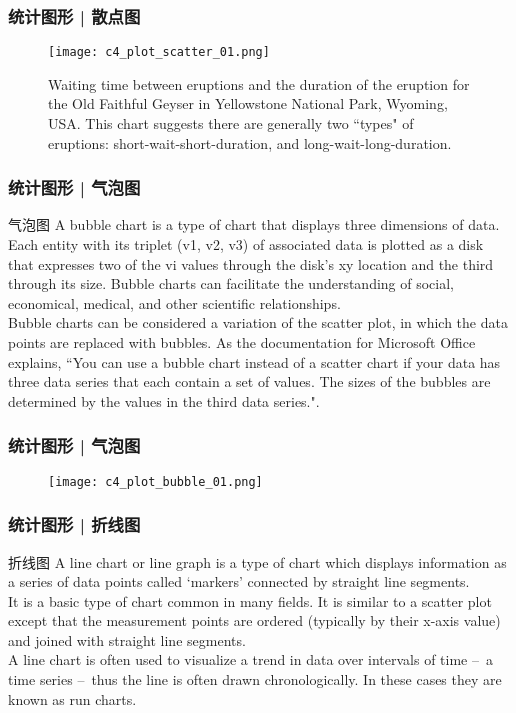\begin{frame}
  \frametitle{统计图形 | 散点图}
  \begin{figure}
    \centering
    \texttt{[image: c4\_plot\_scatter\_01.png]}
    \caption{Waiting time between eruptions and the duration of the eruption for the Old Faithful Geyser in Yellowstone National Park, Wyoming, USA. This chart suggests there are generally two ``types" of eruptions: short-wait-short-duration, and long-wait-long-duration.}
  \end{figure}
\end{frame}

\begin{frame}
  \frametitle{统计图形 | 气泡图}
  \begin{block}{气泡图}
    A bubble chart is a type of chart that displays three dimensions of data. Each entity with its triplet (v1, v2, v3) of associated data is plotted as a disk that expresses two of the vi values through the disk's xy location and the third through its size. Bubble charts can facilitate the understanding of social, economical, medical, and other scientific relationships.\\
    \vspace{0.5em}
Bubble charts can be considered a variation of the scatter plot, in which the data points are replaced with bubbles. As the documentation for Microsoft Office explains, ``You can use a bubble chart instead of a scatter chart if your data has three data series that each contain a set of values. The sizes of the bubbles are determined by the values in the third data series.".
  \end{block}
\end{frame}

\begin{frame}
  \frametitle{统计图形 | 气泡图}
  \begin{figure}
    \centering
    \texttt{[image: c4\_plot\_bubble\_01.png]}
  \end{figure}
\end{frame}

\begin{frame}
  \frametitle{统计图形 | 折线图}
  \begin{block}{折线图}
    A line chart or line graph is a type of chart which displays information as a series of data points called `markers' connected by straight line segments.\\
    \vspace{0.5em}
    It is a basic type of chart common in many fields. It is similar to a scatter plot except that the measurement points are ordered (typically by their x-axis value) and joined with straight line segments.\\
    \vspace{0.5em}
    A line chart is often used to visualize a trend in data over intervals of time –\ a time series –\ thus the line is often drawn chronologically. In these cases they are known as run charts.
  \end{block}
\end{frame}

